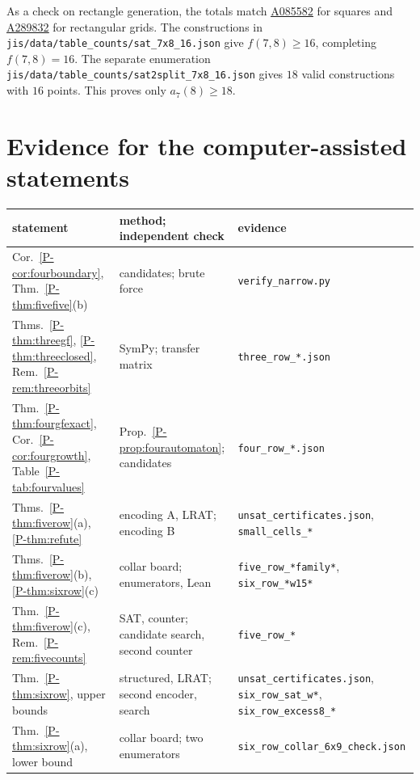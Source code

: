 \documentclass[12pt]{article}
\theoremstyle{plain}
\newcommand{\seqnum}[1]{\href{https://oeis.org/#1}{\rm \underline{#1}}}
\begin{document}
As a check on rectangle generation, the totals match
\seqnum{A085582} for squares and \seqnum{A289832} for rectangular grids.
The constructions in \nolinkurl{jis/data/table_counts/sat_7x8_16.json}
give $f(7,8)\ge16$, completing $f(7,8)=16$.
The separate enumeration
\nolinkurl{jis/data/table_counts/sat2split_7x8_16.json} gives $18$
valid constructions with $16$ points. This proves only $a_7(8)\ge18$.

\clearpage
\section{Evidence for the computer-assisted statements}

\begin{table}[H]
\centering\scriptsize\setlength{\tabcolsep}{3pt}
\begin{tabular}{@{}>{\raggedright\arraybackslash}p{}>{\raggedright\arraybackslash}p{}>{\raggedright\arraybackslash}p{}@{}}
\toprule
statement & method; independent check & evidence \\
\midrule
Cor.~\ref{P-cor:fourboundary}, Thm.~\ref{P-thm:fivefive}(b) & candidates; brute force & \nolinkurl{verify_narrow.py} \\
Thms.~\ref{P-thm:threegf}, \ref{P-thm:threeclosed}, Rem.~\ref{P-rem:threeorbits} & SymPy; transfer matrix & \nolinkurl{three_row_*.json} \\
Thm.~\ref{P-thm:fourgfexact}, Cor.~\ref{P-cor:fourgrowth}, Table~\ref{P-tab:fourvalues} & Prop.~\ref{P-prop:fourautomaton}; candidates & \nolinkurl{four_row_*.json} \\
Thms.~\ref{P-thm:fiverow}(a), \ref{P-thm:refute} & encoding A, LRAT; encoding B & \nolinkurl{unsat_certificates.json}, \nolinkurl{small_cells_*} \\
Thms.~\ref{P-thm:fiverow}(b), \ref{P-thm:sixrow}(c) & collar board; enumerators, Lean & \nolinkurl{five_row_*family*}, \nolinkurl{six_row_*w15*} \\
Thm.~\ref{P-thm:fiverow}(c), Rem.~\ref{P-rem:fivecounts} & SAT, counter; candidate search, second counter & \nolinkurl{five_row_*} \\
Thm.~\ref{P-thm:sixrow}, upper bounds & structured, LRAT; second encoder, search & \nolinkurl{unsat_certificates.json}, \nolinkurl{six_row_sat_w*}, \nolinkurl{six_row_excess8_*} \\
Thm.~\ref{P-thm:sixrow}(a), lower bound & collar board; two enumerators & \nolinkurl{six_row_collar_6x9_check.json} \\

\end{tabular}
\end{table}
\end{document}

